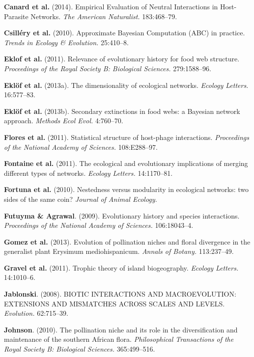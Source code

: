 \documentclass[12pt]{article}
\begin{document}
\hypertarget{ref-cana14een}{}
\textbf{Canard et al.} (2014). Empirical Evaluation of Neutral
Interactions in Host-Parasite Networks. \emph{The American Naturalist.}
183:468--79.

\hypertarget{ref-csil10abc}{}
\textbf{Csilléry et al.} (2010). Approximate Bayesian Computation (ABC)
in practice. \emph{Trends in Ecology \& Evolution.} 25:410--8.

\hypertarget{ref-eklo11reh}{}
\textbf{Eklof et al.} (2011). Relevance of evolutionary history for food
web structure. \emph{Proceedings of the Royal Society B: Biological
Sciences.} 279:1588--96.

\hypertarget{ref-eklo13den}{}
\textbf{Eklöf et al.} (2013a). The dimensionality of ecological
networks. \emph{Ecology Letters.} 16:577--83.

\hypertarget{ref-eklo13sef}{}
\textbf{Eklöf et al.} (2013b). Secondary extinctions in food webs: a
Bayesian network approach. \emph{Methods Ecol Evol.} 4:760--70.

\hypertarget{ref-flor11ssh}{}
\textbf{Flores et al.} (2011). Statistical structure of host-phage
interactions. \emph{Proceedings of the National Academy of Sciences.}
108:E288--97.

\hypertarget{ref-font11eei}{}
\textbf{Fontaine et al.} (2011). The ecological and evolutionary
implications of merging different types of networks. \emph{Ecology
Letters.} 14:1170--81.

\hypertarget{ref-fort10nvm}{}
\textbf{Fortuna et al.} (2010). Nestedness versus modularity in
ecological networks: two sides of the same coin? \emph{Journal of Animal
Ecology.}

\hypertarget{ref-futu09ehs}{}
\textbf{Futuyma \& Agrawal}. (2009). Evolutionary history and species
interactions. \emph{Proceedings of the National Academy of Sciences.}
106:18043--4.

\hypertarget{ref-gome13epn}{}
\textbf{Gomez et al.} (2013). Evolution of pollination niches and floral
divergence in the generalist plant Erysimum mediohispanicum.
\emph{Annals of Botany.} 113:237--49.

\hypertarget{ref-grav11tti}{}
\textbf{Gravel et al.} (2011). Trophic theory of island biogeography.
\emph{Ecology Letters.} 14:1010--6.

\hypertarget{ref-jabl08bim}{}
\textbf{Jablonski}. (2008). BIOTIC INTERACTIONS AND MACROEVOLUTION:
EXTENSIONS AND MISMATCHES ACROSS SCALES AND LEVELS. \emph{Evolution.}
62:715--39.

\hypertarget{ref-john10pnr}{}
\textbf{Johnson}. (2010). The pollination niche and its role in the
diversification and maintenance of the southern African flora.
\emph{Philosophical Transactions of the Royal Society B: Biological
Sciences.} 365:499--516.
\end{document}
